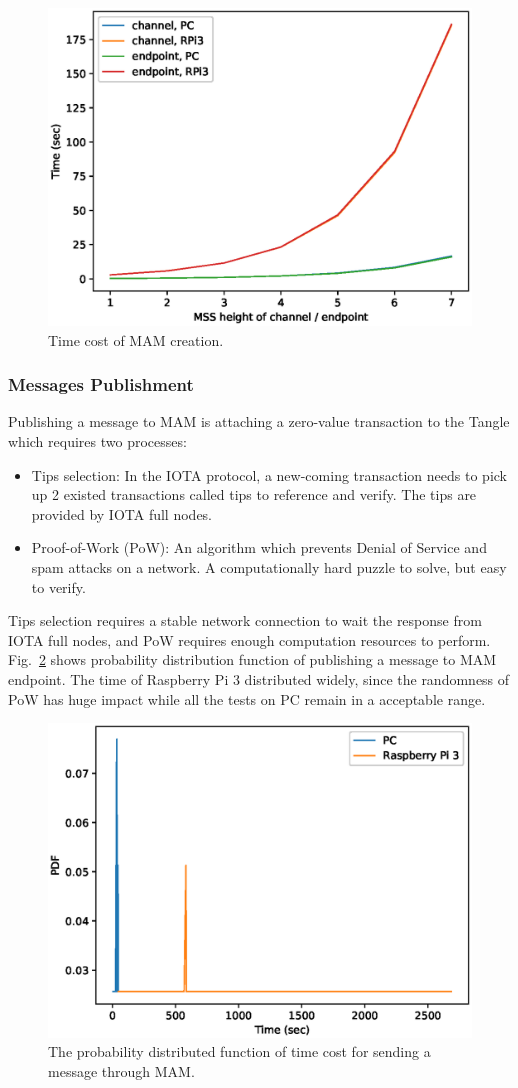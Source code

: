 \documentclass[conference]{IEEEtran}
\begin{document}
\begin{figure}[!t]
    \centering
    \includegraphics[width=3.in]{mam_create}
    \caption{Time cost of MAM creation.}
    \label{fig:mam_create}
\end{figure}

\subsubsection{Messages Publishment}
Publishing a message to MAM is attaching a zero-value transaction to the Tangle which requires two processes:
\begin{itemize}
	\item	Tips selection: In the IOTA protocol, a new-coming transaction needs to pick up 2 existed transactions called tips to reference and verify. The tips are provided by IOTA full nodes.
	\item	Proof-of-Work (PoW): An algorithm which prevents Denial of Service and spam attacks on a network. A computationally hard puzzle to solve, but easy to verify.
\end{itemize}

Tips selection requires a stable network connection to wait the response from IOTA full nodes, and PoW requires enough computation resources to perform. Fig.~\ref{fig:mam_send} shows probability distribution function of publishing a message to MAM endpoint. The time of Raspberry Pi 3 distributed widely, since the randomness of PoW has huge impact while all the tests on PC remain in a acceptable range.

\begin{figure}[!t]
    \centering
    \includegraphics[width=3.in]{mam_send}
    \caption{The probability distributed function of time cost for sending a message through MAM.}
    \label{fig:mam_send}
\end{figure}
\end{document}
